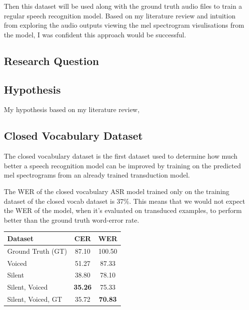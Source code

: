 Then this dataset will be used along with the ground truth audio
files to train a regular speech recognition model. Based on my literature review
and intuition from exploring the audio outputs viewing the mel spectrogram
visulisations from the model, I was confident this approach would be successful.

\subsection{Research Question}

\subsection{Hypothesis}

My hypothesis based on my literature review, 

\subsection{Closed Vocabulary Dataset}

The closed vocabulary dataset is the first dataset used to determine how much better
a speech recognition model can be improved by training on the predicted mel spectrograms
from an already trained transduction model.

The WER of the closed vocabulary ASR model trained only on the training dataset
of the closed vocab dataset is 37\%. This means that we would not expect the WER
of the model, when it's evaluated on transduced examples, to perform better than
the ground truth word-error rate.

{\small\begin{center}
\begin{tabular} {  l  c  c  }
\hline
\textbf{Dataset} & \textbf{CER} & \textbf{WER} \\
\hline
Ground Truth (GT) & 87.10 & 100.50 \\
Voiced & 51.27 & 87.33 \\
Silent & 38.80 & 78.10 \\
Silent, Voiced & \textbf{35.26} & 75.33 \\
\hline
Silent, Voiced, GT & 35.72 & \textbf{70.83} \\
\hline
\end{tabular}
\end{center}}

